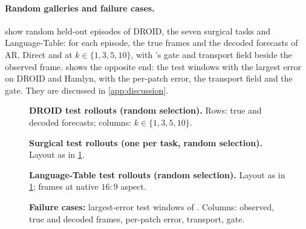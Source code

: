 \paragraph{Random galleries and failure cases.} 
show random held-out episodes of DROID, the seven surgical tasks and Language-Table: for each episode, the true frames
and the decoded forecasts of AR, Direct and \ours{} at $k\in\{1,3,5,10\}$, with \ours{}'s gate and transport field
beside the observed frame.  shows the opposite end: the test windows with the largest \ours{} error
on DROID and Hamlyn, with the per-patch error, the transport field and the gate. They are discussed in
\cref{app:discussion}.

\begin{figure}[tp]
  \centering
  \caption{\textbf{DROID test rollouts (random selection).} Rows: true and decoded forecasts; columns: $k\in\{1,3,5,10\}$.}
  \label{fig:gallery-droid}
\end{figure}
\begin{figure}[tp]
  \centering
  \caption{\textbf{Surgical test rollouts (one per task, random selection).} Layout as in \cref{fig:gallery-droid}.}
  \label{fig:gallery-surgical}
\end{figure}
\begin{figure}[tp]
  \centering
  \caption{\textbf{Language-Table test rollouts (random selection).} Layout as in \cref{fig:gallery-droid}; frames at native $16{:}9$ aspect.}
  \label{fig:gallery-langtable}
\end{figure}
\begin{figure}[tp]
  \centering
  \caption{\textbf{Failure cases:} largest-error test windows of \ours{}. Columns: observed, true and decoded frames, per-patch error, transport, gate.}
  \label{fig:failures}
\end{figure}
